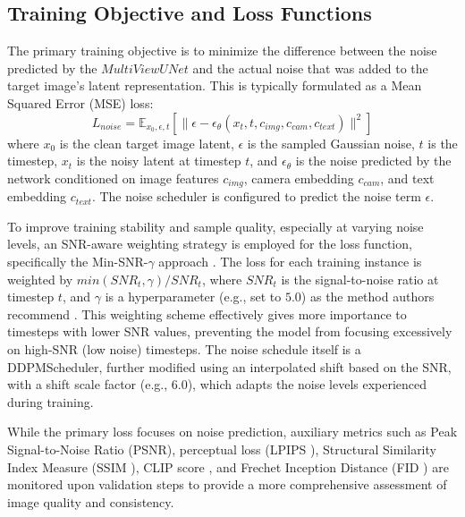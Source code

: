 \subsection{Training Objective and Loss Functions}
The primary training objective is to minimize the difference between the noise predicted by the $MultiViewUNet$ and the actual noise that was added to the target image's latent representation. This is typically formulated as a Mean Squared Error (MSE) loss:
\[ L_{noise} = \mathbb{E}_{x_0, \epsilon, t} [\| \epsilon - \epsilon_\theta(x_t, t, c_{img}, c_{cam}, c_{text}) \|^2] \]
where $x_0$ is the clean target image latent, $\epsilon$ is the sampled Gaussian noise, $t$ is the timestep, $x_t$ is the noisy latent at timestep $t$, and $\epsilon_\theta$ is the noise predicted by the network conditioned on image features $c_{img}$, camera embedding $c_{cam}$, and text embedding $c_{text}$.
The noise scheduler is configured to predict the noise term $\epsilon$.

To improve training stability and sample quality, especially at varying noise levels, an SNR-aware weighting strategy is employed for the loss function, specifically the Min-SNR-$\gamma$ approach \cite{minsnr}. The loss for each training instance is weighted by $min(SNR_t, \gamma) / SNR_t$, where $SNR_t$ is the signal-to-noise ratio at timestep $t$, and $\gamma$ is a hyperparameter (e.g., set to $5.0$) as the method authors recommend \cite{minsnr}. This weighting scheme effectively gives more importance to timesteps with lower SNR values, preventing the model from focusing excessively on high-SNR (low noise) timesteps. The noise schedule itself is a DDPMScheduler, further modified using an interpolated shift based on the SNR, with a shift scale factor (e.g., $6.0$), which adapts the noise levels experienced during training.

While the primary loss focuses on noise prediction, auxiliary metrics such as  Peak Signal-to-Noise Ratio (PSNR), perceptual loss (LPIPS \cite{lpips}), Structural Similarity Index Measure (SSIM \cite{ssim}), CLIP score \cite{clipscore}, and Frechet Inception Distance (FID \cite{fid1, fid2}) are monitored upon validation steps to provide a more comprehensive assessment of image quality and consistency.

